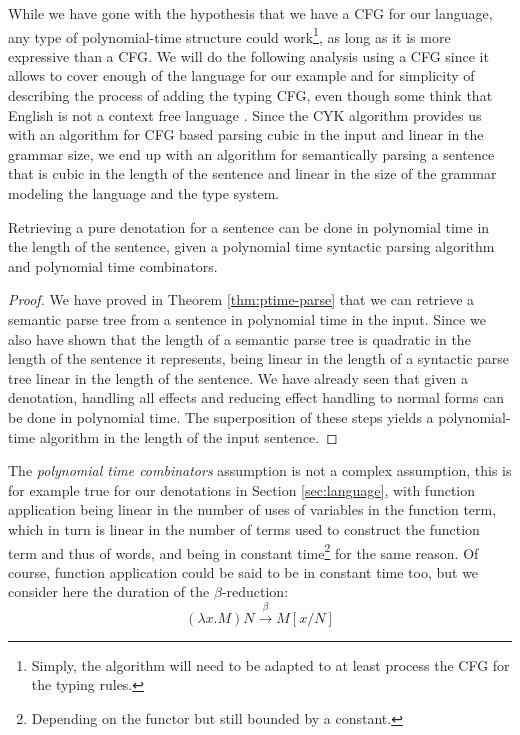 While we have gone with the hypothesis that we have a CFG for our language,
any type of polynomial-time structure could work\footnote{Simply, the algorithm
	will need to be	adapted to at least process the CFG for the typing rules.},
as long as it is more expressive than a CFG.
We will do the following analysis using a CFG since it allows to cover enough of
the language for our example and for simplicity of describing the process of
adding the typing CFG, even though some think that English is not a context
free language \cite{higginbothamEnglishNotContextFree1984}.
Since the CYK algorithm provides us with an algorithm for CFG based parsing
cubic in the input and linear in the grammar size, we end up with an algorithm
for semantically parsing a sentence that is cubic in the length of the sentence
and linear in the size of the grammar modeling the language and the type system.

\begin{thm}
	\label{thm:ptime-denot}
	Retrieving a pure denotation for a sentence can be done in polynomial time in
	the length of the sentence, given a polynomial time syntactic parsing
	algorithm and polynomial time combinators.
\end{thm}
\begin{proof}
	We have proved in Theorem \ref{thm:ptime-parse} that we can retrieve a
	semantic parse tree from a	sentence in polynomial time in the input.
	Since we also have shown that the length of a semantic parse tree is quadratic
	in the length of the sentence it represents, being linear in the length of a
	syntactic parse tree linear in the length of the sentence.
	We have already seen that given a denotation, handling all effects and
	reducing effect handling to normal forms can be done in polynomial time.
	The superposition of these steps yields a polynomial-time algorithm in the
	length of the input sentence.
\end{proof}

The \emph{polynomial time combinators} assumption is not a complex assumption,
this is for example true for our denotations in Section \ref{sec:language},
with function application being linear in the number of uses of variables in
the function term, which in turn is linear in the number of terms used to
construct the function term and thus of words, and \fmap being in constant
time\footnote{Depending on the functor but still bounded by a constant.} for
the same reason.
Of course, function application could be said to be in constant time too, but
we consider here the duration of the $\beta$-reduction:
\begin{equation*}
	\left(\lambda x. M\right)N \xrightarrow{\beta} M\left[x / N\right]
\end{equation*}

